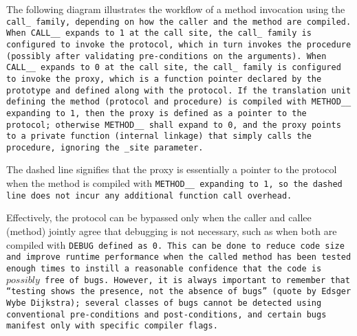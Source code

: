 The following diagram illustrates the workflow of a method invocation using the
\tt{call_} family, depending on how the caller and the method are compiled.
When \tt{CALL__} expands to \tt{1} at the call site, the \tt{call_}
family is configured to invoke the protocol, which in turn invokes the
procedure (possibly after validating pre-conditions on the arguments).
When \tt{CALL__} expands to \tt{0} at the call site, the \tt{call_}
family is configured to invoke the proxy, which is a function pointer
declared by the prototype and defined along with the protocol.
If the translation unit defining the method (protocol and procedure)
is compiled with \tt{METHOD__} expanding to \tt{1}, then the proxy is
defined as a pointer to the protocol; otherwise \tt{METHOD__} shall expand
to \tt{0}, and the proxy points to a private function (internal linkage)
that simply calls the procedure, ignoring the \tt{_site} parameter.

\begin{center}
\end{center}

\note The dashed line signifies that the proxy is essentially a pointer
to the protocol when the method is compiled with \tt{METHOD__} expanding to
\tt{1}, so the dashed line does not incur any additional function call overhead.

Effectively, the protocol can be bypassed only when the caller
and callee (method) jointly agree that debugging is not necessary,
such as when both are compiled with \tt{DEBUG} defined as \tt{0}.
This can be done to reduce code size and improve runtime performance
when the called method has been tested enough times to instill
a reasonable confidence that the code is $possibly$ free of bugs.
However, it is always important to remember that ``\textit{testing shows
the presence, not the absence of bugs}'' (quote by Edsger Wybe Dijkstra);
several classes of bugs cannot be detected using conventional pre-conditions and
post-conditions, and certain bugs manifest only with specific compiler flags.

